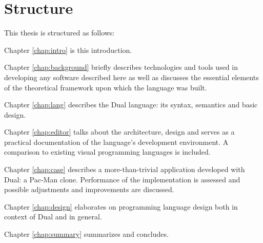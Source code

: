 \section{Structure}
This thesis is structured as follows:

Chapter \ref{chap:intro} is this introduction.

Chapter \ref{chap:background} briefly describes technologies and tools used in developing any software described here as well as discusses the essential elements of the theoretical framework upon which the language was built.

Chapter \ref{chap:lang} describes the Dual language: its syntax, semantics and basic design.

Chapter \ref{chap:editor} talks about the architecture, design and serves as a practical documentation of the language's development environment. A comparison to existing visual programming languages is included.

Chapter \ref{chap:case} describes a more-than-trivial application developed with Dual: a Pac-Man clone. Performance of the implementation is assessed and possible adjustments and improvements are discussed.

Chapter \ref{chap:design} elaborates on programming language design both in context of Dual and in general.

Chapter \ref{chap:summary} summarizes and concludes.
